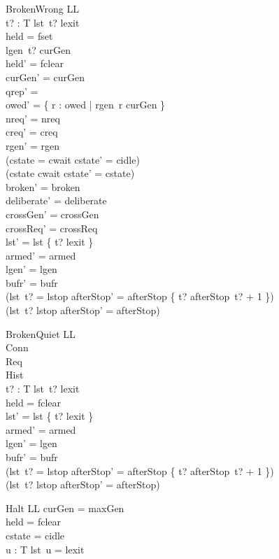 \documentclass[a4paper,10pt,fleqn]{article}
\begin{document}
\begin{schema}{BrokenWrong}
  \Delta LL \\
  t? : T
\where
  lst~t? \neq lexit \\
  held = fset \\
  lgen~t? \neq curGen \\
  held' = fclear \\
  curGen' = curGen \\
  qrep' = \emptyset \\
  owed' = \{ r : owed | rgen~r \neq curGen \} \\
  nreq' = nreq \\
  creq' = creq \\
  rgen' = rgen \\
  (cstate = cwait \implies cstate' = cidle) \\
  (cstate \neq cwait \implies cstate' = cstate) \\
  broken' = broken \\
  deliberate' = deliberate \\
  crossGen' = crossGen \\
  crossReq' = crossReq \\
  lst' = lst \oplus \{ t? \mapsto lexit \} \\
  armed' = armed \\
  lgen' = lgen \\
  bufr' = bufr \\
  (lst~t? = lstop \implies
    afterStop' = afterStop \oplus \{ t? \mapsto afterStop~t? + 1 \}) \\
  (lst~t? \neq lstop \implies afterStop' = afterStop)
\end{schema}

\begin{schema}{BrokenQuiet}
  \Delta LL \\
  \Xi Conn \\
  \Xi Req \\
  \Xi Hist \\
  t? : T
\where
  lst~t? \neq lexit \\
  held = fclear \\
  lst' = lst \oplus \{ t? \mapsto lexit \} \\
  armed' = armed \\
  lgen' = lgen \\
  bufr' = bufr \\
  (lst~t? = lstop \implies
    afterStop' = afterStop \oplus \{ t? \mapsto afterStop~t? + 1 \}) \\
  (lst~t? \neq lstop \implies afterStop' = afterStop)
\end{schema}

\begin{schema}{Halt}
  \Xi LL
\where
  curGen = maxGen \\
  held = fclear \\
  cstate = cidle \\
  \forall u : T \spot lst~u = lexit
\end{schema}
\end{document}
